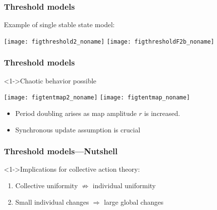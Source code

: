 \begin{frame}
  \frametitle{Threshold models}

  \begin{block}{Example of single stable state model:}
    \begin{center}
      \texttt{[image: figthreshold2\_noname]}
      \texttt{[image: figthresholdF2b\_noname]}
    \end{center}
  \end{block}

\end{frame}


\begin{frame}
  \frametitle{Threshold models}

  \begin{block}<1->{Chaotic behavior possible\cite{granovetter1986a,granovetter1988a,dodds2013a,harris2013a}}
  \begin{center}
    \texttt{[image: figtentmap2\_noname]} 
    \texttt{[image: figtentmap\_noname]} 
  \end{center}

  \begin{itemize}
  \item<2-> Period doubling arises as map amplitude $r$ is increased.
  \item<3-> Synchronous update assumption is crucial
  \end{itemize}
  

  \end{block}

\end{frame}

\begin{frame}
  \frametitle{Threshold models---Nutshell}

  \begin{block}<1->{Implications for collective action theory:}
    \begin{enumerate}
    \item<2-> Collective uniformity $\not\Rightarrow$ individual uniformity
    \item<3-> Small individual changes $\Rightarrow$ large global changes
    \end{enumerate}
  \end{block}

\end{frame}




